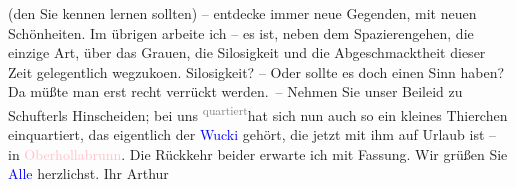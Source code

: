                (den Sie kennen lernen sollten) – entdecke immer neue Gegenden, mit neuen
               Schönheiten. Im übrigen arbeite ich – es ist, neben dem Spazierengehen, die einzige
               Art, über das Grauen, die Si{\geminationn}losigkeit und die
               Abgeschmacktheit dieser Zeit gelegentlich wegzuko{\geminationm}en.
                  Si{\geminationn}losigkeit? – Oder sollte es doch einen Sinn haben?
                  Da{\geminationn} müßte man erst recht verrückt werden. – Nehmen
               Sie unser Beileid zu Schufterls Hinscheiden; bei uns \substVorne{}\textsuperscript{\textcolor{gray}{quartiert}}{\allowbreak}\substDazwischen{}hat\substHinten{} sich \introOben{}nun\introOben{} auch so ein kleines Thierchen
               einquartiert, das eigentlich der \textcolor{blue}{Wucki}{}\ledrightnote{\textcolor{blue}{Hermine Simandt}} gehört,
               die jetzt mit ihm auf Urlaub ist – in \textcolor{pink}{Oberhollabrunn}{}\ledrightnote{\textcolor{pink}{Hollabrunn}}. Die Rückkehr beider erwarte ich mit Fassung.\pend
           \pstart
           Wir grüßen Sie \textcolor{blue}{Alle}{} herzlichst.\pend
           \pstart Ihr \spacefill\mbox{Arthur}\pend{}\endnumbering{}  
      